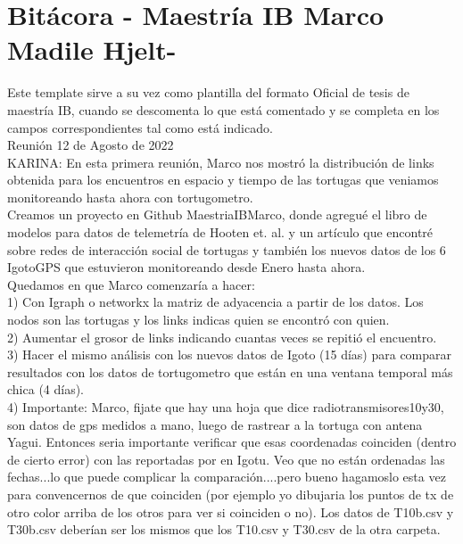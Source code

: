 \documentclass[12pt,screen,twoside,pagebackref]{ibtesis}
\begin{document}
\section*{Bitácora - Maestría IB Marco Madile Hjelt- }

Este template sirve a su vez como plantilla del formato Oficial de tesis de maestría IB, cuando se descomenta lo que está comentado y se completa en los campos correspondientes tal como está indicado.\\ 

Reunión 12 de Agosto de 2022\\

KARINA: En esta primera reunión, Marco nos mostró la distribución de links obtenida para los encuentros en espacio y tiempo de las tortugas que veniamos monitoreando hasta ahora con tortugometro.\\
Creamos un proyecto en Github MaestriaIBMarco, donde agregué el libro de modelos para datos de telemetría de Hooten et. al. y un artículo que encontré sobre redes de interacción social de tortugas y también los nuevos datos de los 6 IgotoGPS que estuvieron monitoreando desde Enero hasta ahora.\\
Quedamos en que Marco comenzaría a hacer:\\
1) Con Igraph o networkx la matriz de adyacencia a partir de los datos. Los nodos son las tortugas y los links indicas quien se encontró con quien.\\ 
2) Aumentar el grosor de links indicando cuantas veces se repitió el encuentro.\\
3) Hacer el mismo análisis con los nuevos datos de Igoto (15 días) para comparar resultados con los datos de tortugometro que están en una ventana temporal más chica (4 días).\\
4) Importante: Marco, fijate que hay una hoja que dice radiotransmisores10y30, son datos de gps medidos a mano, luego de rastrear a la tortuga con antena Yagui. Entonces seria importante verificar que esas coordenadas coinciden (dentro de cierto error) con las reportadas por en Igotu. Veo que no están ordenadas las fechas...lo que puede complicar la comparación....pero bueno hagamoslo esta vez para convencernos de que coinciden (por ejemplo yo dibujaria los puntos de tx de otro color arriba de los otros para ver si coinciden o no). Los datos de T10b.csv y T30b.csv deberían ser los mismos que los T10.csv y T30.csv de la otra carpeta.\\ 
\end{document}
